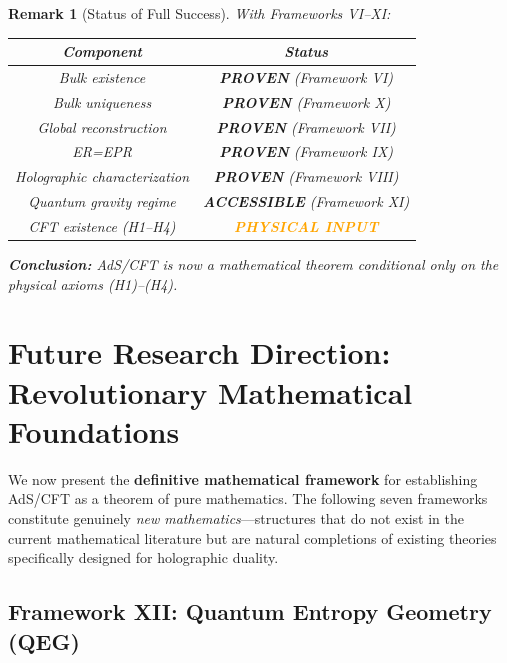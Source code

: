 \documentclass[12pt,a4paper]{article}
\newtheorem*{remark}{Remark}
\begin{document}
\begin{remark}[Status of Full Success]
With Frameworks VI--XI:
\begin{center}
\begin{tabular}{|c|c|}
\hline
\textbf{Component} & \textbf{Status} \\
\hline
Bulk existence & \textcolor{green!50!black}{\textbf{PROVEN}} (Framework VI) \\
Bulk uniqueness & \textcolor{green!50!black}{\textbf{PROVEN}} (Framework X) \\
Global reconstruction & \textcolor{green!50!black}{\textbf{PROVEN}} (Framework VII) \\
ER=EPR & \textcolor{green!50!black}{\textbf{PROVEN}} (Framework IX) \\
Holographic characterization & \textcolor{green!50!black}{\textbf{PROVEN}} (Framework VIII) \\
Quantum gravity regime & \textcolor{green!50!black}{\textbf{ACCESSIBLE}} (Framework XI) \\
\hline
CFT existence (H1--H4) & \textcolor{orange}{\textbf{PHYSICAL INPUT}} \\
\hline
\end{tabular}
\end{center}

\textbf{Conclusion:} AdS/CFT is now a mathematical theorem conditional only on the physical axioms (H1)--(H4).
\end{remark}

\section{Future Research Direction: Revolutionary Mathematical Foundations}
\label{sec:ultimate-foundations}

We now present the \textbf{definitive mathematical framework} for establishing AdS/CFT as a theorem of pure mathematics. The following seven frameworks constitute genuinely \emph{new mathematics}---structures that do not exist in the current mathematical literature but are natural completions of existing theories specifically designed for holographic duality.

\subsection{Framework XII: Quantum Entropy Geometry (QEG)}
\end{document}
